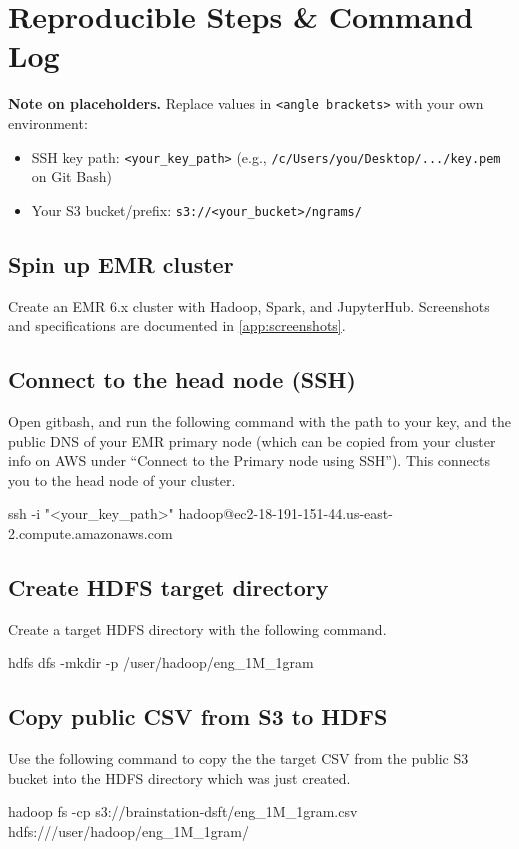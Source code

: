 \documentclass[11pt]{article}
\begin{document}
\section{Reproducible Steps \& Command Log}
\label{sec:steps}

\textbf{Note on placeholders.} Replace values in \texttt{<angle brackets>} with your own environment:
\begin{itemize}
  \item SSH key path: \verb|<your_key_path>| (e.g., \verb|/c/Users/you/Desktop/.../key.pem| on Git Bash)
  \item Your S3 bucket/prefix: \verb|s3://<your_bucket>/ngrams/|
\end{itemize}

\subsection{Spin up EMR cluster}
Create an EMR 6.x cluster with Hadoop, Spark, and JupyterHub. Screenshots and specifications are documented in \cref{app:screenshots}.

\subsection{Connect to the head node (SSH)}
\label{ssh}
Open gitbash, and run the following command with the path to your key, and the public DNS of your EMR primary node (which can be copied from your cluster info on AWS under ``Connect to the Primary node using SSH''). This connects you to the head node of your cluster.\\

\begin{terminal} 
ssh -i "<your_key_path>" hadoop@ec2-18-191-151-44.us-east-2.compute.amazonaws.com
\end{terminal}

\subsection{Create HDFS target directory}
Create a target HDFS directory with the following command.\\
\begin{terminal}
hdfs dfs -mkdir -p /user/hadoop/eng_1M_1gram
\end{terminal}

\subsection{Copy public CSV from S3 to HDFS}
Use the following command to copy the the target CSV from the public S3 bucket into the HDFS directory which was just created.\\
\begin{terminal}
hadoop fs -cp s3://brainstation-dsft/eng_1M_1gram.csv hdfs:///user/hadoop/eng_1M_1gram/
\end{terminal}
\end{document}
